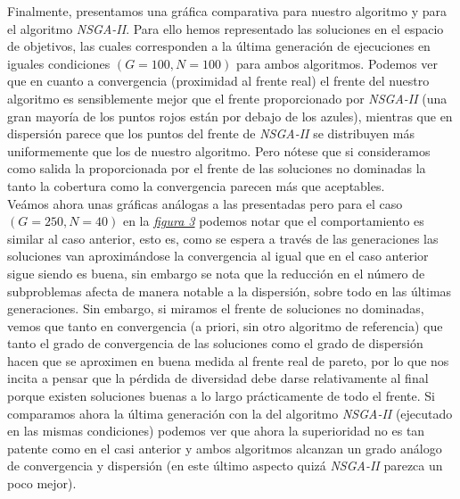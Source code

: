 Finalmente, presentamos una gráfica comparativa para nuestro algoritmo y para el algoritmo \textit{NSGA-II}. Para ello hemos representado las soluciones en el espacio de objetivos, las cuales corresponden a la última generación de ejecuciones en iguales condiciones $(G=100, N=100)$ para ambos algoritmos. Podemos ver que en cuanto a convergencia (proximidad al frente real) el frente del nuestro algoritmo es sensiblemente mejor que el frente proporcionado por  \textit{NSGA-II} (una gran mayoría de los puntos rojos están por debajo de los azules), mientras que en dispersión parece que los puntos del frente de \textit{NSGA-II} se distribuyen más uniformemente que los de nuestro algoritmo. Pero nótese que si consideramos como salida la proporcionada por el frente de las soluciones no dominadas la tanto la cobertura como la convergencia parecen más que aceptables.\\


Veámos ahora unas gráficas análogas a las presentadas pero para el caso $(G=250, N=40)$ en la \hyperref[fig:3]{\textit{figura 3}} podemos notar que el comportamiento es similar al caso anterior, esto es, como se espera a través de las generaciones las soluciones van aproximándose la convergencia al igual que en el caso anterior sigue siendo es buena, sin embargo se nota que la reducción en el número de subproblemas afecta de manera notable a la dispersión, sobre todo en las últimas generaciones. Sin embargo, si miramos el frente de soluciones no dominadas, vemos que tanto en convergencia (a priori, sin otro algoritmo de referencia) que tanto el grado de convergencia de las soluciones como el grado de dispersión hacen que se aproximen en buena medida al frente real de pareto, por lo que nos incita a pensar que la pérdida de diversidad debe darse relativamente al final porque existen soluciones buenas a lo largo prácticamente de todo el frente. Si comparamos ahora la última generación con la del algoritmo \textit{NSGA-II} (ejecutado en las mismas condiciones) podemos ver que ahora la superioridad no es tan patente como en el casi anterior y ambos algoritmos alcanzan un grado análogo de convergencia y dispersión (en este último aspecto quizá \textit{NSGA-II} parezca un poco mejor).\\

